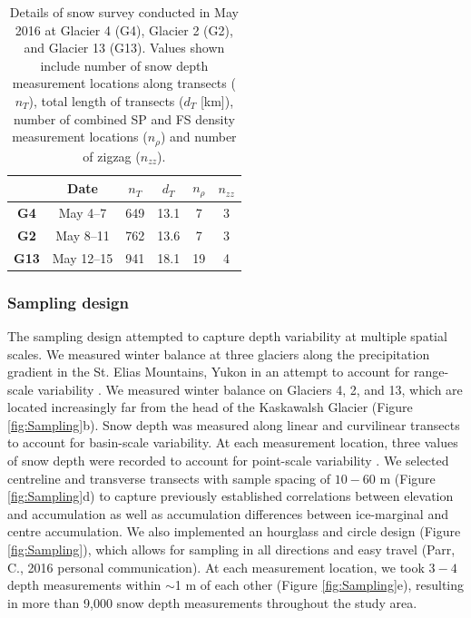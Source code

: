 \documentclass[twocolumn, letterpaper]{igs}
\begin{document}
\begin{table}[]
\centering
\caption{Details of snow survey conducted in May 2016 at Glacier 4 (G4), Glacier 2 (G2), and Glacier 13 (G13). Values shown include number of snow depth measurement locations along transects ($n_{T}$), total length of transects ($d_T$ [km]), number of combined SP and FS density measurement locations ($n_{\rho}$) and number of zigzag ($n_{zz}$). }
\label{tab:SurveyDetails}
\begin{tabular}{cccccc}
\midrule
\textbf{} & \textbf{Date} & \textbf{$n_{T}$} & \textbf{$d_T$} & \textbf{$n_{\rho}$} & \textbf{$n_{zz}$} \\ \midrule
\textbf{G4} & May 4--7 & 649 & 13.1 & 7 & 3 \\
\textbf{G2} & May 8--11 & 762 & 13.6 & 7 & 3 \\
\textbf{G13} & May 12--15 & 941 & 18.1 & 19 & 4
\end{tabular}
\end{table}

\subsubsection{Sampling design}

The sampling design attempted to capture depth variability at multiple spatial scales. We measured winter balance at three glaciers along the precipitation gradient in the St. Elias Mountains, Yukon \citep{Taylor1969} in an attempt to account for range-scale variability \citep{Clark2011}. We measured winter balance on Glaciers 4, 2, and 13, which are located increasingly far from the head of the Kaskawalsh Glacier (Figure \ref{fig:Sampling}b). Snow depth was measured along linear and curvilinear transects to account for basin-scale variability. At each measurement location, three values of snow depth were recorded to account for point-scale variability \citep{Clark2011}.  We selected centreline and transverse transects with sample spacing of $10-60$ m (Figure \ref{fig:Sampling}d) to capture previously established correlations between elevation and accumulation \citep[e.g.][]{Machguth2006, Walmsley2015} as well as accumulation differences between ice-marginal and centre accumulation. We also implemented an hourglass and circle design (Figure \ref{fig:Sampling}), which allows for sampling in all directions and easy travel (Parr, C., 2016 personal communication). At each measurement location, we took $3-4$ depth measurements within $\sim$1 m of each other (Figure \ref{fig:Sampling}e), resulting in more than 9,000 snow depth measurements throughout the study area. 
\end{document}
